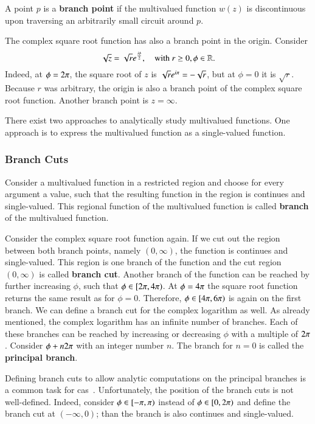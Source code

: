 \begin{definition}
A point $p$ is a \textbf{branch point} if the multivalued function $w(z)$ is discontinuous upon traversing an arbitrarily small circuit around $p$.
\end{definition}

The complex square root function has also a branch point in the origin. Consider
\begin{equation}
\sqrt{z} = \sqrt{r} {e}^{\frac{{i}\phi}{2}},\quad \text{with } r \geq 0, \phi \in \mathbb{R}.
\end{equation}
Indeed, at $\phi = 2{\pi}$, the square root of $z$ is $\sqrt{r}{e}^{{i}{\pi}} = -\sqrt{r}$, but at $\phi = 0$ it is $\sqrt{r}$. Because $r$ was arbitrary, the origin is also a branch point of the complex square root function. Another branch point is $z = \infty$.

There exist two approaches to analytically study multivalued functions. One approach is to express the multivalued function as a single-valued function.

\subsubsection{Branch Cuts}\label{subsec:branch-cuts}
Consider a multivalued function in a restricted region and choose for every argument a value, such that the resulting function in the region is continues and single-valued. This regional function of the multivalued function is called \textbf{branch} of the multivalued function. 

Consider the complex square root function again. If we cut out the region between both branch points, namely $(0, \infty)$, the function is continues and single-valued. This region is one branch of the function and the cut region $(0, \infty)$ is called \textbf{branch cut}. Another branch of the function can be reached by further increasing $\phi$, such that $\phi \in [2{\pi}, 4{\pi})$. At $\phi = 4{\pi}$ the square root function returns the same result as for $\phi=0$. Therefore, $\phi \in [4{\pi}, 6{\pi})$ is again on the first branch. We can define a branch cut for the complex logarithm as well. As already mentioned, the complex logarithm has an infinite number of branches. Each of these branches can be reached by increasing or decreasing $\phi$ with a multiple of $2{\pi}$. Consider $\phi+n2{\pi}$ with an integer number $n$. The branch for $n=0$ is called the \textbf{principal branch}.

Defining branch cuts to allow analytic computations on the principal branches is a common task for \gls{cas}~\cite{Maple:Cuts}. Unfortunately, the position of the branch cuts is not well-defined. Indeed, consider $\phi \in [-{\pi},{\pi})$ instead of $\phi \in [0,2{\pi})$ and define the branch cut at $(-\infty, 0)$; than the branch is also continues and single-valued. 

